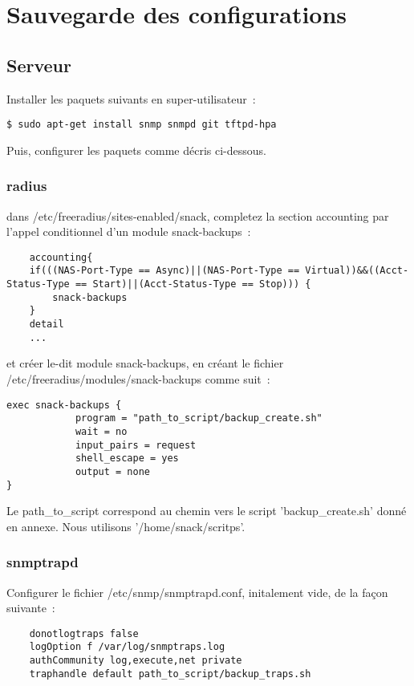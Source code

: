 \section{Sauvegarde des configurations}
\subsection{Serveur}

Installer les paquets suivants en super-utilisateur~:

\begin{lstlisting}
$ sudo apt-get install snmp snmpd git tftpd-hpa
\end{lstlisting}

Puis, configurer les paquets comme décris ci-dessous.

\subsubsection{radius}

dans /etc/freeradius/sites-enabled/snack, completez la section accounting par l'appel conditionnel d'un module snack-backups~:
\begin{lstlisting}
    accounting{
	if(((NAS-Port-Type == Async)||(NAS-Port-Type == Virtual))&&((Acct-Status-Type == Start)||(Acct-Status-Type == Stop))) {
	    snack-backups
	}
	detail
	...
\end{lstlisting}

et créer le-dit module snack-backups, en créant le fichier /etc/freeradius/modules/snack-backups comme suit~:
\begin{lstlisting}
exec snack-backups {
            program = "path_to_script/backup_create.sh"
            wait = no
            input_pairs = request
            shell_escape = yes
            output = none
}
\end{lstlisting}
Le path\_to\_script correspond au chemin vers le script 'backup\_create.sh' donné en annexe. Nous utilisons '/home/snack/scritps'.


\subsubsection{snmptrapd}

Configurer le fichier /etc/snmp/snmptrapd.conf, initalement vide, de la façon suivante~:
\begin{lstlisting}
	donotlogtraps false
	logOption f /var/log/snmptraps.log
	authCommunity log,execute,net private
	traphandle default path_to_script/backup_traps.sh
\end{lstlisting}

